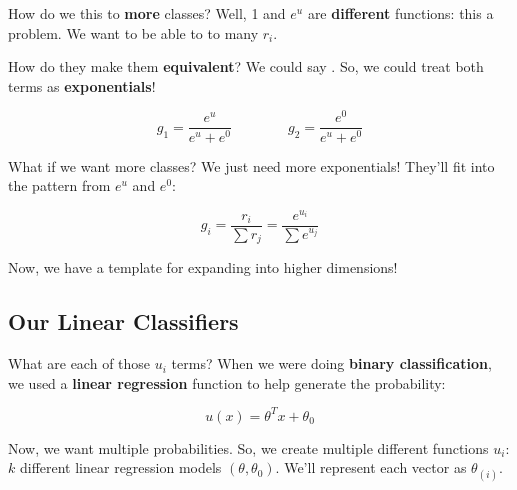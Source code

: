         How do we  this to \textbf{more} classes? Well, 1 and $e^u$ are \textbf{different} functions: this a problem. We want to be able to  to many $r_i$. 
        
        How do they make them \textbf{equivalent}? We could say . So, we could treat both terms as \textbf{exponentials}!
        
        \begin{equation}
            g_1 = \frac{e^u}{e^u+e^0} \qquad \qquad
            g_2 = \frac{e^0}{e^u+e^0}
        \end{equation}
        
        What if we want more classes? We just need more exponentials! They'll fit into the pattern from $e^u$ and $e^0$:
        
        \begin{equation}
             g_i 
            =             \frac{r_i}{\sum r_j} 
            = 
            \frac{e^{u_i}}{\sum e^{u_j}}
        \end{equation}

        Now, we have a template for expanding into higher dimensions!
        
    \subsection{Our Linear Classifiers}
    
        What are each of those $u_i$ terms? When we were doing \textbf{binary classification}, we used a \textbf{linear regression} function to help generate the probability:
        
        \begin{equation}
            u(x) = \theta^Tx+\theta_0
        \end{equation}

        Now, we want multiple probabilities. So, we create multiple different functions $u_i$: $k$ different linear regression models $(\theta,\theta_0)$. We'll represent each vector as $\theta_{(i)}$.
        

